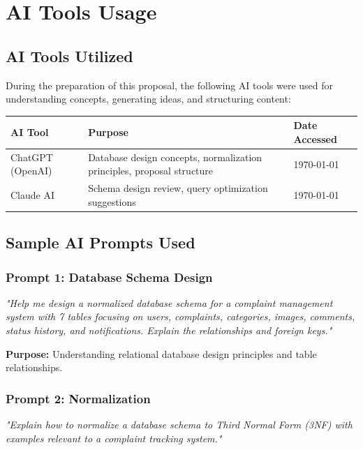 \documentclass[12pt,a4paper]{article}
\begin{document}
\appendix

\section{AI Tools Usage}

\subsection{AI Tools Utilized}

During the preparation of this proposal, the following AI tools were used for understanding concepts, generating ideas, and structuring content:

\begin{table}[h]
\centering
\begin{tabular}{|p{3cm}|p{5cm}|p{5cm}|}
\hline
\textbf{AI Tool} & \textbf{Purpose} & \textbf{Date Accessed} \\
\hline
ChatGPT (OpenAI) & Database design concepts, normalization principles, proposal structure & \today \\
\hline
Claude AI & Schema design review, query optimization suggestions & \today \\
\hline
\end{tabular}
\end{table}

\subsection{Sample AI Prompts Used}

\subsubsection{Prompt 1: Database Schema Design}
\textit{"Help me design a normalized database schema for a complaint management system with 7 tables focusing on users, complaints, categories, images, comments, status history, and notifications. Explain the relationships and foreign keys."}

\textbf{Purpose:} Understanding relational database design principles and table relationships.

\subsubsection{Prompt 2: Normalization}
\textit{"Explain how to normalize a database schema to Third Normal Form (3NF) with examples relevant to a complaint tracking system."}
\end{document}
